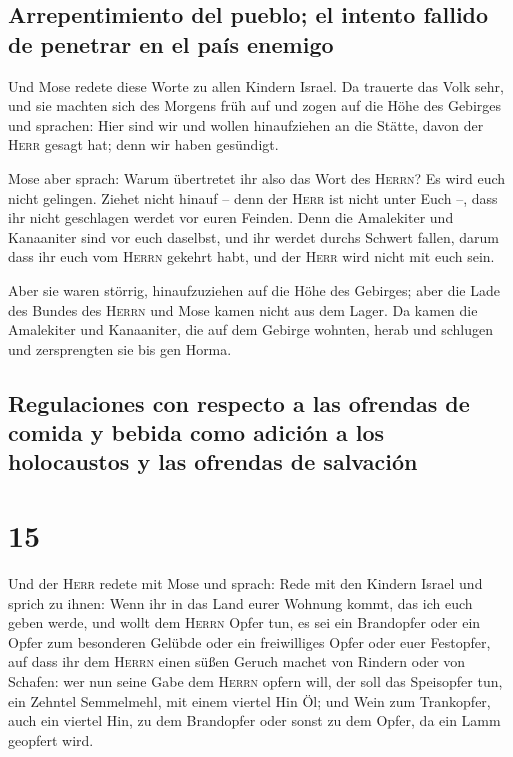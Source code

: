 \hypertarget{arrepentimiento-del-pueblo-el-intento-fallido-de-penetrar-en-el-pauxeds-enemigo}{%
\subsection{Arrepentimiento del pueblo; el intento fallido de penetrar
en el país
enemigo}\label{arrepentimiento-del-pueblo-el-intento-fallido-de-penetrar-en-el-pauxeds-enemigo}}

 Und Mose redete diese Worte zu allen Kindern Israel. Da
trauerte das Volk sehr,  und sie machten sich des Morgens
früh auf und zogen auf die Höhe des Gebirges und sprachen: Hier sind wir
und wollen hinaufziehen an die Stätte, davon der \textsc{Herr} gesagt
hat; denn wir haben gesündigt.

 Mose aber sprach: Warum übertretet ihr also das Wort des
\textsc{Herrn}? Es wird euch nicht gelingen.  Ziehet
nicht hinauf -- denn der \textsc{Herr} ist nicht unter Euch --, dass ihr
nicht geschlagen werdet vor euren Feinden.  Denn die
Amalekiter und Kanaaniter sind vor euch daselbst, und ihr werdet durchs
Schwert fallen, darum dass ihr euch vom \textsc{Herrn} gekehrt habt, und
der \textsc{Herr} wird nicht mit euch sein.

 Aber sie waren störrig, hinaufzuziehen auf die Höhe des
Gebirges; aber die Lade des Bundes des \textsc{Herrn} und Mose kamen
nicht aus dem Lager.  Da kamen die Amalekiter und
Kanaaniter, die auf dem Gebirge wohnten, herab und schlugen und
zersprengten sie bis gen Horma.

\hypertarget{regulaciones-con-respecto-a-las-ofrendas-de-comida-y-bebida-como-adiciuxf3n-a-los-holocaustos-y-las-ofrendas-de-salvaciuxf3n}{%
\subsection{Regulaciones con respecto a las ofrendas de comida y bebida
como adición a los holocaustos y las ofrendas de
salvación}\label{regulaciones-con-respecto-a-las-ofrendas-de-comida-y-bebida-como-adiciuxf3n-a-los-holocaustos-y-las-ofrendas-de-salvaciuxf3n}}

\hypertarget{section-14}{%
\section{15}\label{section-14}}

 Und der \textsc{Herr} redete mit Mose und sprach:
 Rede mit den Kindern Israel und sprich zu ihnen: Wenn ihr
in das Land eurer Wohnung kommt, das ich euch geben werde,
 und wollt dem \textsc{Herrn} Opfer tun, es sei ein
Brandopfer oder ein Opfer zum besonderen Gelübde oder ein freiwilliges
Opfer oder euer Festopfer, auf dass ihr dem \textsc{Herrn} einen süßen
Geruch machet von Rindern oder von Schafen:  wer nun seine
Gabe dem \textsc{Herrn} opfern will, der soll das Speisopfer tun, ein
Zehntel Semmelmehl, mit einem viertel Hin Öl;  und Wein
zum Trankopfer, auch ein viertel Hin, zu dem Brandopfer oder sonst zu
dem Opfer, da ein Lamm geopfert wird.

